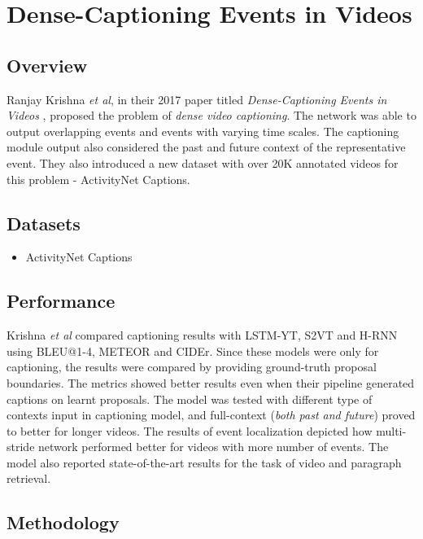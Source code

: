 \section{Dense-Captioning Events in Videos}

\subsection{Overview}

\par Ranjay Krishna \textit{et al}, in their 2017 paper titled \textit{Dense-Captioning Events in Videos} \cite{krishna2017densecaptioning}, proposed the problem of \textit{dense video captioning}. The network was able to output overlapping events and events with varying time scales. The captioning module output also considered the past and future context of the representative event. They also introduced a new dataset with over 20K annotated videos for this problem - ActivityNet Captions.


\subsection{Datasets}
\begin{itemize}
\item ActivityNet Captions
\end{itemize}

\subsection{Performance}
\par Krishna \textit{et al} compared captioning results with LSTM-YT\cite{venugopalan2015sequence}, S2VT\cite{venugopalan2015translating} and H-RNN\cite{yu2016video} using BLEU@1-4, METEOR and CIDEr. Since these models were only for captioning, the results were compared by providing ground-truth proposal boundaries. The metrics showed better results even when their pipeline generated captions on learnt proposals. The model was tested with different type of contexts input in captioning model, and full-context (\textit{both past and future}) proved to better for longer videos. The results of event localization depicted how multi-stride network performed better for videos with more number of events. The model also reported state-of-the-art results for the task of video and paragraph retrieval.


\subsection{Methodology}

